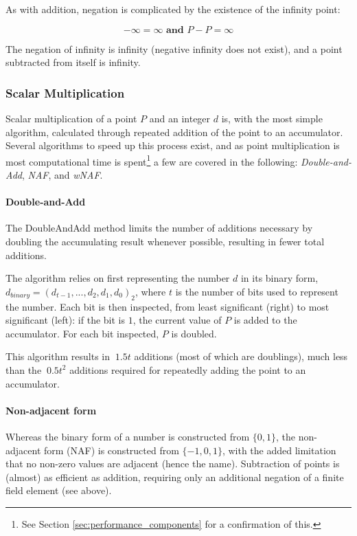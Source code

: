 As with addition, negation is complicated by the existence of the infinity point:

\begin{equation}
	-\infty = \infty \textbf{ and } P - P = \infty
\end{equation}

The negation of infinity is infinity (negative infinity does not exist), and a point subtracted from itself is infinity.\cite{hankerson2010}

\subsubsection{Scalar Multiplication}

Scalar multiplication of a point \(P\) and an integer \(d\) is, with the most simple algorithm, calculated through repeated addition
of the point to an accumulator. Several algorithms to speed up this process exist, and as point multiplication is most computational
time is spent\footnote{See Section \ref{sec:performance_components} for a confirmation of this.} a few are covered in the following:
\emph{Double-and-Add}, \emph{NAF}, and \emph{wNAF}.

\paragraph{Double-and-Add}

The DoubleAndAdd method limits the number of additions necessary by doubling the accumulating result whenever possible, resulting in
fewer total additions.

The algorithm relies on first representing the number \(d\) in its binary form, \(d_{binary} = (d_{t-1}, ... , d_2, d_1, d_0)_2\),
where \(t\) is the number of bits used to represent the number. Each bit is then inspected, from least significant (right) to most
significant (left): if the bit is \(1\), the current value of \(P\) is added to the accumulator. For each bit inspected, \(P\) is
doubled.\cite{hankerson2010}

This algorithm results in \(~1.5t\) additions (most of which are doublings), much less than the \(~0.5t^2\) additions required for
repeatedly adding the point to an accumulator.

\paragraph{Non-adjacent form}

Whereas the binary form of a number is constructed from \(\{0,1\}\), the non-adjacent form (NAF) is constructed from \(\{-1,0,1\}\), with
the added limitation that no non-zero values are adjacent (hence the name). Subtraction of points is (almost) as efficient as addition,
requiring only an additional negation of a finite field element (see above).

